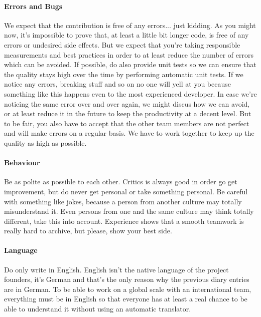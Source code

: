 \paragraph{Errors and Bugs}
We expect that the contribution is free of any errors... just kidding. As you might now, it's impossible to prove that, at least a little bit longer code, is free of any errors or undesired side effects. But we expect that you're taking responsible measurements and best practices in order to at least reduce the number of errors which can be avoided. If possible, do also provide unit tests so we can ensure that the quality stays high over the time by performing automatic unit tests. If we notice any errors, breaking stuff and so on no one will yell at you because something like this happens even to the most experienced developer. In case we're noticing the same error over and over again, we might discus how we can avoid, or at least reduce it in the future to keep the productivity at a decent level. But to be fair, you also have to accept that the other team members are not perfect and will make errors on a regular basis. We have to work together to keep up the quality as high as possible.


\paragraph{Behaviour}
Be as polite as possible to each other. Critics is always good in order go get improvement, but do never get personal or take something personal. Be careful with something like jokes, because a person from another culture may totally misunderstand it. Even persons from one and the same culture may think totally different, take this into account. Experience shows that a smooth teamwork is really hard to archive, but please, show your best side.


\paragraph{Language}
Do only write in English. English isn't the native language of the project founders, it's German and that's the only reason why the previous diary entries are in German. To be able to work on a global scale with an international team, everything must be in English so that everyone has at least a real chance to be able to understand it without using an automatic translator.


